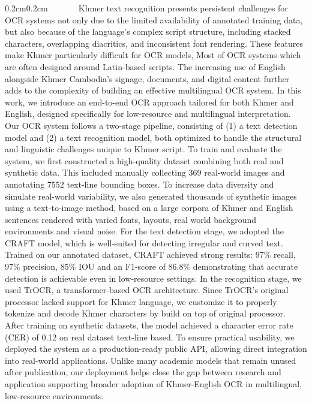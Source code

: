 \begin{adjustwidth}{0.2cm}{0.2cm}
    \label{abstract}
    \englishfont\fontsize{13.5pt}{17pt}\selectfont 
    ​ ​ ​ ​ ​ ​ ​​ ​ ​ ​  Khmer text recognition presents persistent challenges for OCR 
    systems not only due to the limited availability of annotated 
    training data, but also because of the language's complex script 
    structure, including stacked characters, overlapping diacritics, 
    and inconsistent font rendering. These features make Khmer 
    particularly difficult for OCR models, Most of OCR systems which 
    are often designed around Latin-based scripts. The increasing 
    use of English alongside Khmer Cambodia’s signage, documents, 
    and digital content further adds to the complexity of building 
    an effective multilingual OCR system. In this work, we introduce an end-to-end OCR approach tailored 
    for both Khmer and English, designed specifically for 
    low-resource and multilingual interpretation. Our OCR system 
    follows a two-stage pipeline, consisting of (1) a text detection 
    model and (2) a text recognition model, both optimized to handle 
    the structural and linguistic challenges unique to Khmer script.
    To train and evaluate the system, we first constructed a 
    high-quality dataset combining both real and synthetic data. 
    This included manually collecting 369 real-world images and 
    annotating 7552 text-line bounding boxes. To increase data 
    diversity and simulate real-world variability, we also generated 
    thousands of synthetic images using a text-to-image method, 
    based on a large corpora of Khmer and English sentences rendered 
    with varied fonts, layouts, real world background environments 
    and visual noise.
    For the text detection stage, we adopted the CRAFT model, which 
    is well-suited for detecting irregular and curved text. Trained 
    on our annotated dataset, CRAFT achieved strong results: 97\% 
    recall, 97\% precision, 85\% IOU and an F1-score of 86.8\% demonstrating 
    that accurate detection is achievable even in low-resource 
    settings. In the recognition stage, we used TrOCR, a transformer-based 
    OCR architecture. Since TrOCR’s original processor lacked 
    support for Khmer language, we customize it to properly tokenize 
    and decode Khmer characters by build on top of original 
    processor. After training on synthetic 
    datasets, the model achieved a character error rate (CER) of 
    0.12 on real dataset text-line based. To ensure practical usability, 
    we deployed the system as a 
    production-ready public API, allowing direct integration into 
    real-world applications. Unlike many academic models that 
    remain unused after publication, our deployment helps close 
    the gap between research and application supporting broader 
    adoption of Khmer-English OCR in multilingual, low-resource 
    environments.



    
    \end{adjustwidth}